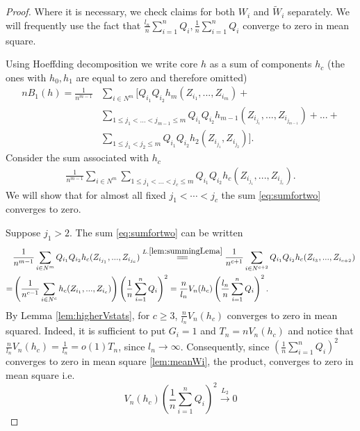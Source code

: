 \documentclass{article} %
\begin{document}
\begin{proof}
Where  it is necessary, we check claims for both $W_i$ and  $\tilde W_i$ separately. We will frequently use the fact that 
$
 \frac{l_n}{n} \sum_{i=1}^{n}Q_i, \frac{1}{n} \sum_{i=1}^{n}Q_i
$
converge to zero in mean square.

Using Hoeffding decomposition we  write core  $h$ as a sum of components $h_c$ (the ones with $h_0,h_1$ are equal to zero and therefore omitted)
\begin{align*}
 n B_1(h) = \frac{1} {n^{m-1}}  &\sum_{i \in N^m}  \Big[ Q_{i_1} Q_{i_2}   h_m(Z_{i_1},...,Z_{i_m})  + \\ 
 &\sum_{1 \leq j_1 < ...<j_{m-1} \leq m } Q_{i_1} Q_{i_2} h_{m-1}(Z_{i_{j_1}},...,Z_{i_{j_{m-1}}})   + ... + \\
 &\sum_{1 \leq j_1 < j_2 \leq m } Q_{i_1} Q_{i_2} h_2(Z_{i_{j_1}},Z_{i_{j_2}}) \Big].
\end{align*}
Consider the sum associated with $h_c$
\begin{align}
\label{eq:sumfortwo}
\frac{1} {n^{m-1}}  \sum_{i \in N^m}  \sum_{1 \leq j_1 < ...<j_c \leq m } Q_{i_1} Q_{i_2} h_c(Z_{i_{j_1}},...,Z_{i_{j_c}}).
\end{align}
We will show that for almost all fixed  $j_1 < \cdots < j_c$ the sum \ref{eq:sumfortwo} converges to zero.

Suppose  $j_1 >2$. The sum \ref{eq:sumfortwo} can be written
\begin{align*}
&\frac{1} {n^{m-1}}  \sum_{i \in N^m}   Q_{i_1} Q_{i_2} h_c(Z_{i_{j_1}},...,Z_{i_{j_c}})	 \overset{L.\ref{lem:summingLema}}{=\joinrel=}  
\frac{1} {n^{c+1}}  \sum_{i \in N^{c+2}}   Q_{i_1} Q_{i_2} h_c(Z_{i_3},...,Z_{i_{c+2}})  \\
=& \left( \frac{1}{n^{c-1}}   \sum_{ i \in N^c} h_c(Z_{i_1},...,Z_{i_c}) \right) \left( \frac{1}{n} \sum_{i=1}^{n}Q_i \right)^2  = \frac{n}{l_n}V_n(h_c)  \left( \frac{l_n}{n} \sum_{i=1}^{n}Q_i \right)^2 .  
\end{align*}
By   Lemma \ref{lem:higherVstats}, for $c \geq 3$, $\frac{n}{l_n} V_n(h_{c})$  converges to zero in mean squared. Indeed, it is sufficient to put $G_i=1$ and $T_n = n V_n(h_{c})$ and notice that $\frac{n}{l_n} V_n(h_{c}) = \frac{1}{l_n} = o(1)T_n$, since $l_n \to \infty$. Consequently, since   $(\frac{1}{n} \sum_{i=1}^{n}Q_i)^2$ converges to zero in mean square  \ref{lem:meanWi}, the product, converges to zero in mean square i.e.
\[
 V_n(h_c)  \left( \frac{1}{n} \sum_{i=1}^{n}Q_i \right)^2  \overset{L_2}{\to} 0
\]



\end{proof}
\end{document}
